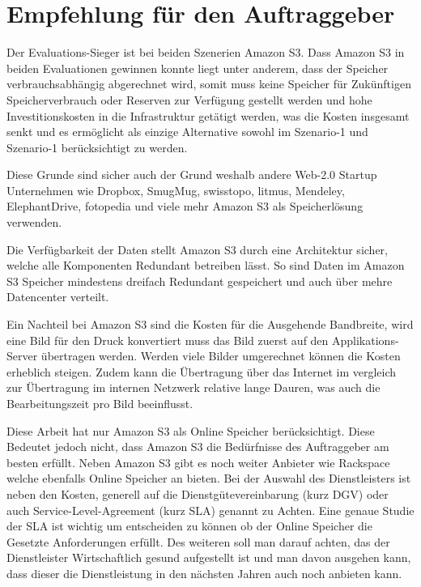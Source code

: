 \cleardoublepage
\chapter{Empfehlung für den Auftraggeber}

Der Evaluations-Sieger ist bei beiden Szenerien Amazon S3. Dass Amazon S3 in beiden Evaluationen gewinnen konnte liegt unter anderem, dass der Speicher verbrauchsabhängig abgerechnet wird, somit muss keine Speicher für Zukünftigen Speicherverbrauch oder Reserven zur Verfügung gestellt werden und hohe Investitionskosten in die Infrastruktur getätigt werden, was die Kosten insgesamt senkt und es ermöglicht als einzige Alternative sowohl im Szenario-1 und Szenario-1 berücksichtigt zu werden.

Diese Grunde sind sicher auch der Grund weshalb andere Web-2.0 Startup Unternehmen wie Dropbox, SmugMug, swisstopo, litmus, Mendeley, ElephantDrive, fotopedia und viele mehr Amazon S3 als Speicherlösung verwenden.

Die Verfügbarkeit der Daten stellt Amazon S3 durch eine Architektur sicher, welche alle Komponenten Redundant betreiben lässt. So sind Daten im Amazon S3 Speicher mindestens dreifach Redundant gespeichert und auch über mehre Datencenter verteilt.

Ein Nachteil bei Amazon S3 sind die Kosten für die Ausgehende Bandbreite, wird eine Bild für den Druck konvertiert muss das Bild zuerst auf den Applikations-Server übertragen werden. Werden viele Bilder umgerechnet können die Kosten erheblich steigen. Zudem kann die Übertragung über das Internet im vergleich zur Übertragung im internen Netzwerk relative lange Dauren, was auch die Bearbeitungszeit pro Bild beeinflusst.

Diese Arbeit hat nur Amazon S3 als Online Speicher berücksichtigt. Diese Bedeutet jedoch nicht, dass Amazon S3 die Bedürfnisse des Auftraggeber am besten erfüllt. Neben Amazon S3 gibt es noch weiter Anbieter wie Rackspace welche ebenfalls Online Speicher an bieten. Bei der Auswahl des Dienstleisters ist neben den Kosten, generell auf die Dienstgütevereinbarung (kurz DGV) oder auch Service-Level-Agreement (kurz SLA) genannt zu Achten. Eine genaue Studie der SLA ist wichtig um entscheiden zu können ob der Online Speicher die Gesetzte Anforderungen erfüllt. Des weiteren soll man darauf achten, das der Dienstleister Wirtschaftlich gesund aufgestellt ist und man davon ausgehen kann, dass dieser die Dienstleistung in den nächsten Jahren auch noch anbieten kann. 

